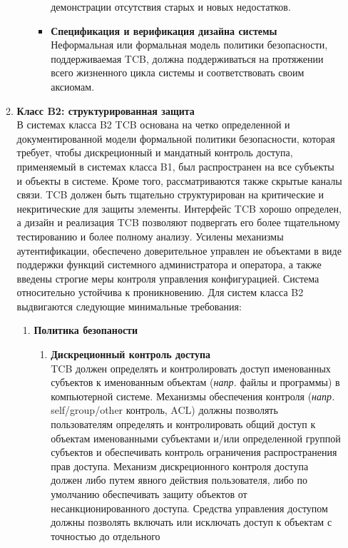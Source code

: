 \begin{enumerate}
\begin{enumerate}
\begin{enumerate}
\begin{itemize}
				демонстрации отсутствия старых и новых недостатков. 
				\item{\textbf{Спецификация и верификация дизайна системы}}\\
				Неформальная или формальная модель политики безопасности, поддерживаемая TCB, должна поддерживаться на протяжении всего жизненного цикла системы и соответствовать своим аксиомам.
			\end{itemize}
		\end{enumerate}
		\item{\textbf{Класс B2: структурированная защита}}\\
		В системах класса B2 TCB основана на четко определенной и документированной модели формальной политики безопасности, которая требует, чтобы дискреционный и мандатный контроль доступа, 
		применяемый в системах класса B1, был распространен на все субъекты и объекты в системе. Кроме того, рассматриваются также скрытые каналы связи. TCB должен быть тщательно структурирован 
		на критические и некритические для защиты элементы.  Интерфейс TCB хорошо определен, а дизайн и реализация TCB позволяют подвергать его более тщательному тестированию и более 
		полному анализу. Усилены механизмы аутентификации, обеспечено доверительное управлен	ие объектами в виде поддержки функций системного администратора и оператора, а также введены 
		строгие меры контроля управления конфигурацией. Система относительно устойчива к проникновению. Для систем класса B2 выдвигаются следующие минимальные требования:
		\begin{enumerate}
			\item{\textbf{Политика безопаности}}
			\begin{enumerate}
				\item{\textbf{Дискреционный контроль доступа}}\\
				TCB должен определять и контролировать доступ именованных субъектов к именованным объектам (\textit{напр.} файлы и программы) в компьютерной системе. Механизмы обеспечения контроля
				(\textit{напр.} self/group/other контроль, ACL) должны позволять пользователям определять и контролировать общий доступ к объектам именованными субъектами и/или определенной группой
				субъектов и обеспечивать контроль ограничения распространения прав доступа. Механизм дискреционного контроля доступа должен либо путем явного действия пользователя, либо по умолчанию
				обеспечивать защиту объектов от несанкционированного доступа. Средства управления доступом должны позволять включать или исключать доступ к объектам с точностью до отдельного

\end{enumerate}
\end{enumerate}
\end{enumerate}
\end{enumerate}
